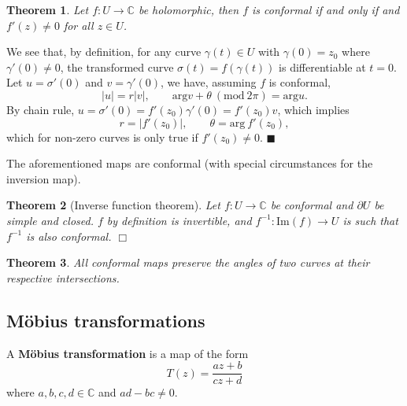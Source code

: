 \documentclass[letter-paper]{tufte-book}
\newtheorem{theorem}{\color{pastel-blue}Theorem}[section]
\newenvironment{proof}[1][Proof]{\begin{trivlist}
\item[\hskip \labelsep {\bfseries #1}]}{\end{trivlist}}
\newcommand{\qed}{\hfill$\blacksquare$}
\newcommand{\qedwhite}{\hfill \ensuremath{\Box}}
\begin{document}
\begin{theorem}
  Let $f: U \to \mathbb{C}$ be holomorphic, then $f$ is conformal if and only if
  and $f'(z) \neq 0$ for all $z\in U$.
\end{theorem}

\begin{proof}
  We see that, by definition, for any curve $\gamma(t) \in U$ with $\gamma(0) =
  z_0$ where $\gamma'(0) \neq 0$, the transformed curve $\sigma(t) =
  f(\gamma(t))$ is differentiable at $t=0$. Let $u = \sigma'(0)$ and $v =
  \gamma'(0)$, we have, assuming $f$ is conformal,
  \begin{equation*}
    |u| = r|v|, \qquad \mathrm{arg} v + \theta\ (\mathrm{mod}\ 2\pi) = \mathrm{arg} u.
  \end{equation*}
  By chain rule, $u = \sigma'(0) = f'(z_0) \gamma'(0) = f'(z_0) v$, which
  implies
  \begin{equation*}
    r = |f'(z_0)|, \qquad \theta = \mathrm{arg}\ f'(z_0),
  \end{equation*}
  which for non-zero curves is only true if $f'(z_0) \neq 0$. \qed
\end{proof}

The aforementioned maps are conformal (with special circumstances for the
inversion map).

\begin{theorem}[Inverse function theorem]
  Let $f: U \to \mathbb{C}$ be conformal and $\partial U$ be simple and closed.
  $f$ by definition is invertible, and $f^{-1} : \mathrm{Im}(f) \to U$ is such
  that $f^{-1}$ is also conformal. \qedwhite
\end{theorem}

\begin{theorem}
  All conformal maps preserve the angles of two curves at their respective
  intersections.
\end{theorem}


\subsection{M\"obius transformations}

A \textbf{M\"obius transformation} is a map of the form
\begin{equation}
  T(z) = \frac{az + b}{cz + d}
\end{equation}
where $a,b,c,d \in \mathbb{C}$ and $ad - bc \neq 0$.
\end{document}
